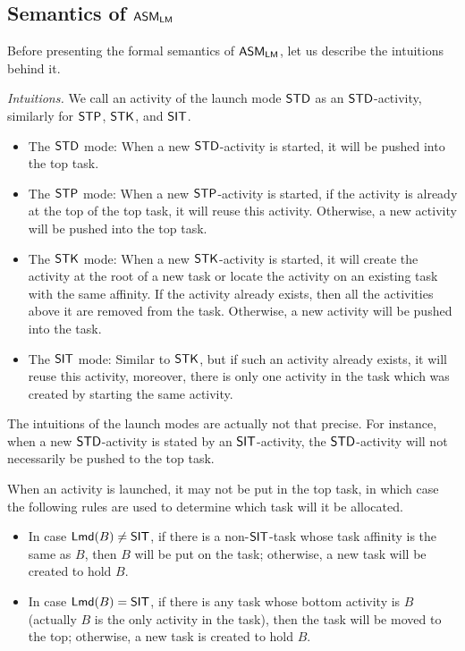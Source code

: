 

\subsection{Semantics of $\textsf{ASM}_\textsf{LM}$}


Before presenting the formal semantics of $\textsf{ASM}_\textsf{LM}$, let us describe the intuitions behind it.

%
\noindent\emph{Intuitions.}  %
We call an activity of the launch mode $\mathsf{STD}$ as an $\mathsf{STD}$-activity, similarly for $\mathsf{STP}$, $\mathsf{STK}$, and $\mathsf{SIT}$. 
\begin{itemize}
	\item The $\mathsf{STD}$ mode: When a new $\mathsf{STD}$-activity is started, it will be pushed into the top task. 
	\item The $\mathsf{STP}$ mode: When a new $\mathsf{STP}$-activity is started, if the activity is already at the top of the top task, it will reuse this activity. Otherwise, a new activity will be pushed into the top task.
	\item The $\mathsf{STK}$ mode: When a new $\mathsf{STK}$-activity is started, it will create the activity at the root of a new task or locate the activity on an existing task with the same affinity. If the activity already exists, then all the activities above it are removed from the task. Otherwise, a new activity will be pushed into the task.
	\item The $\mathsf{SIT}$ mode: 
	Similar to $\mathsf{STK}$, but if such an activity already exists, it will reuse this activity, moreover, there is only one activity in the task which was created by starting the same activity.
\end{itemize}

The intuitions of the launch modes are actually not that precise. For instance, when a new $\mathsf{STD}$-activity is stated by an $\mathsf{SIT}$-activity, the $\mathsf{STD}$-activity will not necessarily be pushed to the top task. 


When an activity is launched, it may not be put in the top task, in which case  
the following rules are used to determine which task will it be allocated. 
\begin{itemize}
	\item In case ${\sf Lmd}(B) \neq \mathsf{SIT}$, if there is a non-$\mathsf{SIT}$-task whose task affinity is the same as $B$, then $B$ will be put on the task; otherwise, a new task will be created to hold $B$.
	
	\item In case ${\sf Lmd}(B) = \mathsf{SIT}$,    if there is any task whose bottom activity is $B$ (actually $B$ is the only activity in the task), then the task will be moved to the top; otherwise, a new task is created to hold $B$.
\end{itemize}

